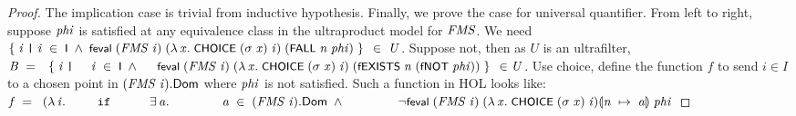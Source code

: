 \documentclass[letterpaper]{article}
\renewcommand{\HOLConst}[1]{{\textsf{\upshape\small #1}}}
\renewcommand{\HOLinline}[1]{\ensuremath{#1}}
\renewcommand{\HOLKeyword}[1]{\texttt{#1}}
\begin{document}
\begin{proof}
The implication case is trivial from inductive hypothesis. Finally, we prove the case for universal quantifier. 
From left to right, suppose \HOLinline{\HOLFreeVar{phi}} is satisfied at any equivalence class in the ultraproduct model for \HOLinline{\HOLFreeVar{FMS}}. We need \HOLinline{\HOLTokenLeftbrace{}\HOLBoundVar{i}\;\HOLTokenBar{}\\
\;\HOLBoundVar{i}\;\HOLSymConst{\HOLTokenIn{}}\;\HOLConst{I}\;\HOLSymConst{\HOLTokenConj{}}\;\HOLConst{feval}\;(\HOLFreeVar{FMS}\;\HOLBoundVar{i})\;(\HOLTokenLambda{}\HOLBoundVar{x}.\;\HOLConst{CHOICE}\;(\HOLFreeVar{\ensuremath{\sigma}}\;\HOLBoundVar{x})\;\HOLBoundVar{i})\;(\HOLConst{FALL}\;\HOLFreeVar{n}\;\HOLFreeVar{phi})\HOLTokenRightbrace{}\;\HOLSymConst{\HOLTokenIn{}}\;\HOLFreeVar{U}}. Suppose not, then as $U$ is an ultrafilter, \HOLinline{\HOLFreeVar{B}\;\HOLSymConst{=}\\
\;\;\HOLTokenLeftbrace{}\HOLBoundVar{i}\;\HOLTokenBar{}\\
\;\;\;\;\;\HOLBoundVar{i}\;\HOLSymConst{\HOLTokenIn{}}\;\HOLConst{I}\;\HOLSymConst{\HOLTokenConj{}}\\
\;\;\;\;\;\HOLConst{feval}\;(\HOLFreeVar{FMS}\;\HOLBoundVar{i})\;(\HOLTokenLambda{}\HOLBoundVar{x}.\;\HOLConst{CHOICE}\;(\HOLFreeVar{\ensuremath{\sigma}}\;\HOLBoundVar{x})\;\HOLBoundVar{i})\;(\HOLConst{fEXISTS}\;\HOLFreeVar{n}\;(\HOLConst{fNOT}\;\HOLFreeVar{phi}))\HOLTokenRightbrace{}\;\HOLSymConst{\HOLTokenIn{}}\\
\HOLFreeVar{U}}. Use choice, define the function $f$ to send $i\in I$ to a chosen point in \HOLinline{(\HOLFreeVar{FMS}\;\HOLFreeVar{i}).\HOLFieldName{Dom}} where \HOLinline{\HOLFreeVar{phi}} is not satisfied. Such a function in HOL looks like:
\HOLinline{\HOLFreeVar{f}\;\HOLSymConst{=}\\
\;\;(\HOLTokenLambda{}\HOLBoundVar{i}.\\
\;\;\;\;\;\;\;\;\;\HOLKeyword{if}\\
\;\;\;\;\;\;\;\;\;\;\;\HOLSymConst{\HOLTokenExists{}}\HOLBoundVar{a}.\\
\;\;\;\;\;\;\;\;\;\;\;\;\;\;\;\HOLBoundVar{a}\;\HOLSymConst{\HOLTokenIn{}}\;(\HOLFreeVar{FMS}\;\HOLBoundVar{i}).\HOLFieldName{Dom}\;\HOLSymConst{\HOLTokenConj{}}\\
\;\;\;\;\;\;\;\;\;\;\;\;\;\;\;\HOLSymConst{\HOLTokenNeg{}}\HOLConst{feval}\;(\HOLFreeVar{FMS}\;\HOLBoundVar{i})\;(\HOLTokenLambda{}\HOLBoundVar{x}.\;\HOLConst{CHOICE}\;(\HOLFreeVar{\ensuremath{\sigma}}\;\HOLBoundVar{x})\;\HOLBoundVar{i})\ensuremath{\llparenthesis}\HOLFreeVar{n}\;\ensuremath{\mapsto}\;\HOLBoundVar{a}\ensuremath{\rrparenthesis}\;\HOLFreeVar{phi}\\
}
\end{proof}
\end{document}
